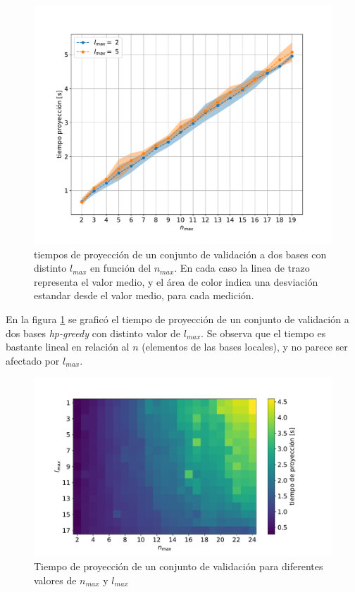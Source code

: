 \begin{figure}[h!]
\centering
\includegraphics[width=.8\columnwidth ,trim={0, 1cm, 0, 1.2cm}]{figs/t_vs_nmax.pdf}
\caption{tiempos de proyección de un conjunto de validación a dos bases con distinto $l_{max}$ en función del $n_{max}$. En cada caso la linea de trazo representa el valor medio, y el área de color indica una desviación estandar desde el valor medio, para cada medición.}
\label{fig:t_vs_nmax}
\end{figure}


En la figura \ref{fig:t_vs_nmax} se graficó el tiempo de proyección de un conjunto de validación a dos bases \textit{hp-greedy} con distinto valor de $l_{max}$. Se observa que el tiempo es bastante lineal en relación al $n$ (elementos de las bases locales), y no parece ser afectado por $l_{max}$.



\begin{figure}[h!]
\centering
\includegraphics[width=.9\columnwidth, trim={0, 1cm, 0, 1.4cm}]{figs/nmax_lmax_t_grid.pdf}
\caption{Tiempo de proyección de un conjunto de validación para diferentes valores de $n_{max}$ y $l_{max}$}
\label{fig:t_grilla_nl}
\end{figure}



